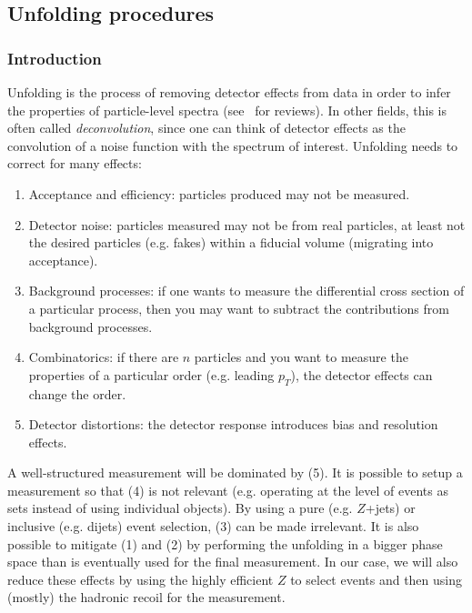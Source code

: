 \subsection{Unfolding procedures}

\subsubsection{Introduction}
\label{sec:UnfoldIntro}

Unfolding is the process of removing detector effects from data in order to infer the properties of particle-level spectra (see~\cite{Cowan:2002in,Blobel:2203257,doi:10.1002/9783527653416.ch6,Balasubramanian:2019itp} for reviews).  In other fields, this is often called \textit{deconvolution}, since one can think of detector effects as the convolution of a noise function with the spectrum of interest.  Unfolding needs to correct for many effects:

\begin{enumerate}[label={(\arabic*)}]
\item Acceptance and efficiency: particles produced may not be measured.
\item Detector noise: particles measured may not be from real particles, at least not the desired particles (e.g. fakes) within a fiducial volume (migrating into acceptance).
\item Background processes: if one wants to measure the differential cross section of a particular process, then you may want to subtract the contributions from background processes.
\item Combinatorics: if there are $n$ particles and you want to measure the properties of a particular order (e.g. leading $p_T$), the detector effects can change the order.
\item Detector distortions: the detector response introduces bias and resolution effects.
\end{enumerate}

A well-structured measurement will be dominated by (5).  It is possible to setup a measurement so that (4) is not relevant (e.g. operating at the level of events as sets instead of using individual objects).  By using a pure (e.g. $Z$+jets) or inclusive (e.g. dijets) event selection, (3) can be made irrelevant.  It is also possible to mitigate (1) and (2) by performing the unfolding in a bigger phase space than is eventually used for the final measurement.  In our case, we will also reduce these effects by using the highly efficient $Z$ to select events and then using (mostly) the hadronic recoil for the measurement.

